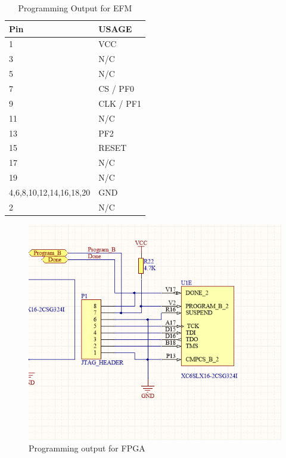 \begin{table}[]
    \centering
    \begin{tabular}{ll}
        Pin                     & USAGE     \\
        \hline
        1                       & VCC       \\
        3                       & N/C       \\
        5                       & N/C       \\
        7                       & CS / PF0  \\
        9                       & CLK / PF1 \\
        11                      & N/C       \\
        13                      & PF2       \\
        15                      & RESET     \\
        17                      & N/C       \\
        19                      & N/C       \\
        4,6,8,10,12,14,16,18,20 & GND       \\
        2                       & N/C
    \end{tabular}
    \caption{Programming Output for EFM}
    \label{tab:EfmProgrammer}
\end{table}

\begin{figure}
    \includegraphics[width=\linewidth]{img/FPGA_Programmer}
    \caption{Programming output for FPGA}
    \label{fig:FpgaProgrammer}
\end{figure}

